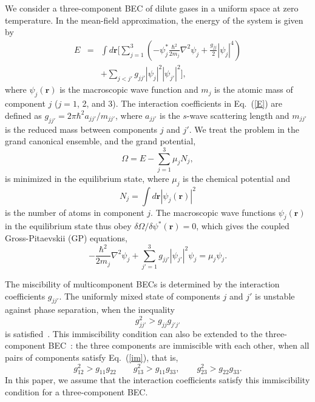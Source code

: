 \documentclass[pra,aps,superscriptaddress,twocolumn,color]{revtex4-1}
\begin{document}
We consider a three-component BEC of dilute gases in a uniform space at zero
temperature.
In the mean-field approximation, the energy of the system is given by
\begin{eqnarray} \label{E}
  E & = & \int d\bm{r} \Biggl[ \sum_{j=1}^3 \left( -\psi_j^*
    \frac{\hbar^2}{2 m_j}   \nabla^2 \psi_j + \frac{g_{jj}}{2} |\psi_j|^4
    \right) \nonumber \\
& & + \sum_{j < j'} g_{jj'} |\psi_j|^2 |\psi_{j'}|^2 \Biggr],
\end{eqnarray}
where $\psi_j(\bm{r})$ is the macroscopic wave function and $m_j$ is the
atomic mass of component $j$ ($j = 1$, 2, and 3).
The interaction coefficients in Eq.~(\ref{E}) are defined as $g_{jj'} = 2\pi
\hbar^2 a_{jj'} / m_{jj'}$, where $a_{jj'}$ is the $s$-wave scattering
length and $m_{jj'}$ is the reduced mass between components $j$ and $j'$.
We treat the problem in the grand canonical ensemble, and the grand
potential,
\begin{equation} \label{Omega}
\Omega = E - \sum_{j=1}^3 \mu_j N_j,
\end{equation}
is minimized in the equilibrium state, where $\mu_j$ is the chemical
potential and
\begin{equation}
N_j = \int d\bm{r} |\psi_j(\bm{r})|^2
\end{equation}
is the number of atoms in component $j$.
The macroscopic wave functions $\psi_j(\bm{r})$ in the equilibrium state
thus obey $\delta \Omega / \delta\psi^*(\bm{r}) = 0$, which gives the
coupled Gross-Pitaevskii (GP) equations,
\begin{equation} \label{GP}
-\frac{\hbar^2}{2m_j} \nabla^2 \psi_j + \sum_{j' = 1}^3 g_{jj'}
|\psi_{j'}|^2 \psi_j = \mu_j \psi_j.
\end{equation}

The miscibility of multicomponent BECs is determined by the interaction
coefficients $g_{jj'}$.
The uniformly mixed state of components $j$ and $j'$ is unstable against
phase separation, when the inequality
\begin{equation} \label{im}
g_{jj'}^2 > g_{jj} g_{j'j'}
\end{equation}
is satisfied~\cite{Pethick}.
This immiscibility condition can also be extended to the three-component
BEC~\cite{Roberts}: the three components are immiscible with each other,
when all pairs of components satisfy Eq.~(\ref{im}), that is,
\begin{equation} \label{im3}
  g_{12}^2 > g_{11} g_{22} \qquad
  g_{13}^2 > g_{11} g_{33}, \qquad
  g_{23}^2 > g_{22} g_{33}.
\end{equation}
In this paper, we assume that the interaction coefficients satisfy this
immiscibility condition for a three-component BEC.
\end{document}
